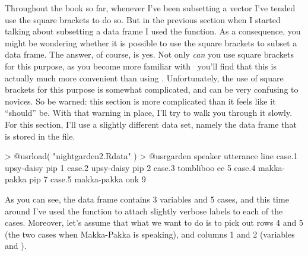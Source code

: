 Throughout the book so far, whenever I've been subsetting a vector I've tended use the square brackets \rtext{[]} to do so. But in the previous section when I started talking about subsetting a data frame I used the  function. As a consequence, you might be wondering whether it is possible to use the square brackets to subset a data frame. The answer, of course, is yes. Not only {\it can} you use square brackets for this purpose, as you become more familiar with \R\ you'll find that this is actually much more convenient than using . Unfortunately, the use of square brackets for this purpose is somewhat complicated, and can be very confusing to novices. So be warned: this section is more complicated than it feels like it ``should'' be. With that warning in place, I'll try to walk you through it slowly. For this section, I'll use a slightly different data set, namely the  data frame that is stored in the  file. 
\begin{rblock1}
> @usr{load( "nightgarden2.Rdata" )}
> @usr{garden}
           speaker utterance line
case.1  upsy-daisy       pip    1
case.2  upsy-daisy       pip    2
case.3   tombliboo        ee    5
case.4 makka-pakka       pip    7
case.5 makka-pakka       onk    9
\end{rblock1} 
As you can see, the  data frame contains 3 variables and 5 cases, and this time around I've used the  function to attach slightly verbose labels to each of the cases. Moreover, let's assume that what we want to do is to pick out rows 4 and 5 (the two cases when Makka-Pakka is speaking), and columns 1 and 2 (variables  and ).

